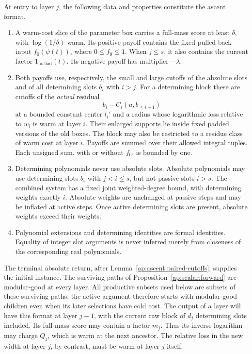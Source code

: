 \begin{definition}\label{ap:ascent:format}
At entry to layer $j$, the following data and properties constitute
the ascent format.
\begin{enumerate}[label=\textup{(\roman*)}]
\item A warm-cost slice of the parameter box carries a full-mass
score at least $\delta$, with $\log(1/\delta)$ warm.  Its positive
payoff contains the fixed pulled-back input $f_0(\psi(t))$, where
$0\leq f_0\leq1$.  When $j\leq s$, it also contains the current
factor $1_{\mathrm{no\ bad}}(t)$.  Its negative payoff has multiplier
$-\lambda$.

\item Both payoffs use, respectively, the small and large cutoffs of
the absolute slots and of all determining slots $b_i$ with $i>j$.
For a determining block these are cutoffs of the \emph{actual}
residual
\[
                  b_i-C_i(u,b_{\leq i-1})
\]
at a bounded constant center $l_i'$ and a radius whose logarithmic
loss relative to $w_i$ is warm at layer $i$.  Their enlarged supports
lie inside fixed padded versions of the old boxes.  The block may
also be restricted to a residue class of warm cost at layer $i$.
Payoffs are summed over their allowed integral tuples.  Each unsigned
sum, with or without $f_0$, is bounded by one.

\item Determining polynomials never use absolute slots.  Absolute
polynomials may use determining slots $b_i$ with $j<i\leq s$, but
not passive slots $i>s$.  The combined system has a fixed joint
weighted-degree bound, with determining weights exactly $i$.
Absolute weights are unchanged at passive steps and may be inflated
at active steps.  Once active determining slots are present, absolute
weights exceed their weights.

\item Polynomial extensions and determining identities are formal
identities.  Equality of integer slot arguments is never inferred
merely from closeness of the corresponding real polynomials.
\end{enumerate}
\end{definition}

The terminal absolute return, after
Lemma~\ref{ap:ascent:paired-cutoffs}, supplies the initial instance.
The surviving paths of Proposition~\ref{ap:scalar:forward} are
modular-good at every layer.  All productive subsets used below are
subsets of these surviving paths; the active argument therefore starts
with modular-good children even when its later selections have cold cost.
The output of a layer will have this format at layer $j-1$, with
the current raw block of $d_j$ determining slots included.  Its
full-mass score may contain a factor $m_j$.  Thus its inverse
logarithm may charge $Q_j$, which is warm at the next ancestor.
The relative loss in the new width at layer $j$, by contrast, must
be warm at layer $j$ itself.

